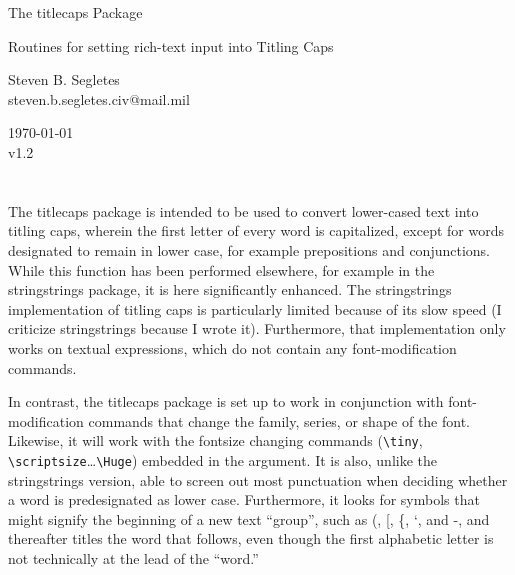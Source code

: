 \documentclass{article}
\def\version{1.2}
\def\tcp{\textsf{titlecaps}}
\let\vb\verb
\begin{document}
\begin{center}
\LARGE The {\tcp} Package\\
\rule{0em}{.7em}\small Routines for setting rich-text input into
Titling Caps\\
\rule{0em}{2.7em}\large Steven B. Segletes\\
steven.b.segletes.civ@mail.mil\\
\rule{0em}{1.7em}\today\\
v\version
\end{center}

\section{}

The {\tcp} package is intended to be used to convert lower-cased text
into titling caps, wherein the first letter of every word is
capitalized, except for words designated to remain in lower case, for
example prepositions and conjunctions.  While this function has been
performed elsewhere, for example in the \textsf{stringstrings} package,
it is here significantly enhanced.  The \textsf{stringstrings}
implementation of titling caps is particularly limited because of its
slow speed (I criticize \textsf{stringstrings} because I wrote it).
Furthermore, that implementation only works on textual expressions,
which do not contain any font-modification commands.  

In contrast, the {\tcp} package is set up to work in conjunction with
font-modification commands that change the family, series, or shape of
the font.  Likewise, it will work with the fontsize changing commands
(\vb|\tiny|, \vb|\scriptsize|\ldots\SoftSpace\vb|\Huge|) embedded in the
argument.  It is also, unlike the \textsf{stringstrings} version, able
to screen out most punctuation when deciding whether a word is
predesignated as lower case.  Furthermore, it looks for symbols that
might signify the beginning of a new text ``group'', such as (, [, \{,
`, and -, and thereafter titles the word that follows, even though the
first alphabetic letter is not technically at the lead of the ``word.''
\end{document}
